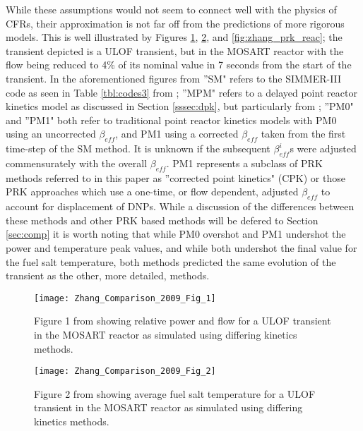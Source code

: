 \documentclass[review]{elsarticle}
\begin{document}
While these assumptions would not seem to connect well
with the physics of CFRs, their approximation is not far off from the
predictions of more rigorous models. This is well illustrated by Figures
\ref{fig:zhang_prk_flow}, \ref{fig:zhang_prk_temp}, and 
\ref{fig:zhang_prk_reac};
the transient depicted is a ULOF transient, but in the MOSART reactor with the
flow being reduced to 4\% of its nominal value in 7 seconds from the start
of the transient. In
the aforementioned figures from \cite{zhang_comparison_2009} ''SM" refers
to the SIMMER-III code as seen in Table \ref{tbl:codes3} from
\cite{rineiski_kinetics_2005}; ''MPM" refers to a delayed point reactor kinetics
model as discussed in Section \ref{sssec:dpk}, but particularly from
\cite{suzuki_reactivity-initiated-accident_2008}; ''PM0" and ''PM1" both
refer to traditional point reactor kinetics models with PM0 using an
uncorrected $\beta_{eff}$, and PM1 using a corrected $\beta_{eff}$ taken from
the first time-step of the SM method. It is unknown if the subsequent
$\beta_{eff}^{i}$s were adjusted commensurately with the overall $\beta_{eff}$.
PM1 represents a subclass of PRK methods referred to in this paper as
''corrected point kinetics" (CPK) or those PRK approaches which use a one-time, or
flow dependent, adjusted $\beta_{eff}$ to account for
displacement of DNPs.
While a discussion of the differences between these methods and other 
PRK based methods will be defered to Section \ref{sec:comp}
it is worth noting that
while PM0 overshot and PM1 undershot the power and temperature peak values, and
while both undershot the final value for the fuel salt temperature, both methods
predicted the same evolution of the transient as the other, more detailed,
methods.

\begin{figure}[H]
   \centering
   \texttt{[image: Zhang\_Comparison\_2009\_Fig\_1]}
   \caption{Figure 1 from \cite{zhang_comparison_2009} showing relative power and flow for a 
   ULOF transient in the MOSART reactor as simulated using differing kinetics methods.} 
   \label{fig:zhang_prk_flow}
\end{figure}

\begin{figure}[H]
   \centering
   \texttt{[image: Zhang\_Comparison\_2009\_Fig\_2]}
   \caption{Figure 2 from \cite{zhang_comparison_2009} showing average fuel salt temperature for a
   ULOF transient in the MOSART reactor as simulated using differing kinetics methods.} 
   \label{fig:zhang_prk_temp}
\end{figure}
\end{document}
